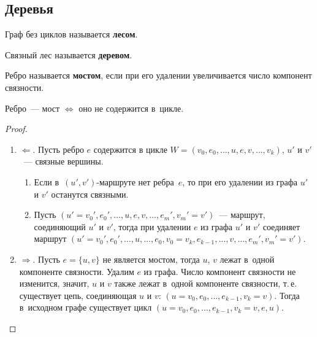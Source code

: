 \subsection{Деревья}
 Граф без циклов называется \textbf{лесом}.

 Связный лес называется \textbf{деревом}.

 Ребро называется \textbf{мостом}, если при его удалении увеличивается число компонент связности.

\begin{statement}
\label{st:criterion_of_bridge_in_graph}
Ребро~--- мост $\Leftrightarrow$ оно не содержится в~цикле.
\end{statement}
\begin{proof}
\begin{enumerate}
	\item $\Leftarrow$.
	Пусть ребро $e$ содержится в цикле $W = (v_0, e_0, \ldots, u, e, v, \ldots, v_k)$, $u'$ и $v'$~--- связные вершины.
	\begin{enumerate}
		\item Если в~$(u', v')$-маршруте нет ребра~$e$, то при его удалении из графа $u'$ и $v'$ останутся связными.
		\item Пусть $(u' = v_0', e_0', \ldots, u, e, v, \ldots, e_m', v_m' = v')$~--- маршрут, соединяющий $u'$ и $v'$, тогда при удалении $e$ из графа $u'$ и $v'$ соединяет маршрут
		$(u' = v_0', e_0', \ldots, u, \ldots, e_0, v_0 = v_k, e_{k-1}, \ldots, v, \ldots, e_m', v_m' = v')$.
	\end{enumerate}
	
	\item $\Rightarrow$.
	Пусть $e = \{ u, v \}$ не является мостом, тогда $u$, $v$ лежат в~одной компоненте связности.
	Удалим $e$ из графа.
	Число компонент связности не изменится, значит, $u$ и $v$ также лежат в~одной компоненте связности, т.\,е. существует цепь, соединяющая $u$ и $v$: $(u = v_0, e_0, \ldots, e_{k-1}, v_k = v)$.
	Тогда в~исходном графе существует цикл $(u = v_0, e_0, \ldots, e_{k-1}, v_k = v, e, u)$.
\end{enumerate}
\end{proof}

